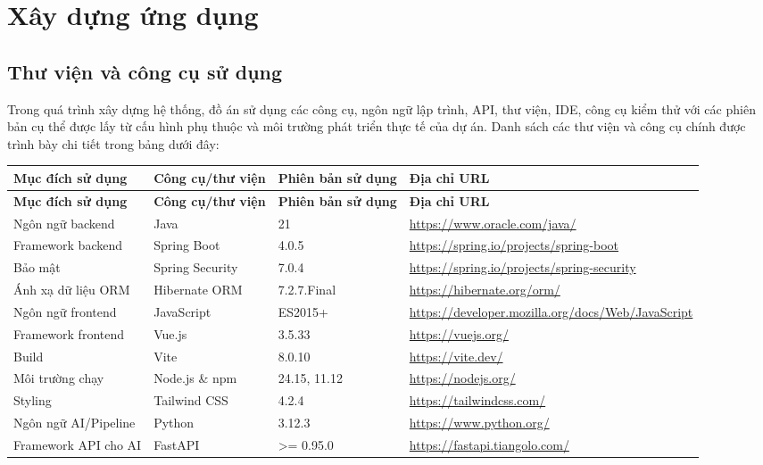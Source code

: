 \documentclass[../DoAn.tex]{subfiles}
\begin{document}
\section{Xây dựng ứng dụng}
\label{section:4.3}

\subsection{Thư viện và công cụ sử dụng}
\label{subsection:4.3.1}

Trong quá trình xây dựng hệ thống, đồ án sử dụng các công cụ, ngôn ngữ lập trình, API, thư viện, IDE, công cụ kiểm thử với các phiên bản cụ thể được lấy từ cấu hình phụ thuộc và môi trường phát triển thực tế của dự án. Danh sách các thư viện và công cụ chính được trình bày chi tiết trong bảng dưới đây:

\begin{longtable}{|p{3.5cm}|p{2.5cm}|p{2.0cm}|p{5.0cm}|}
\hline
\textbf{Mục đích sử dụng} & \textbf{Công cụ/thư viện} & \textbf{Phiên bản sử dụng} & \textbf{Địa chỉ URL} \\
\hline
\endfirsthead
\hline
\textbf{Mục đích sử dụng} & \textbf{Công cụ/thư viện} & \textbf{Phiên bản sử dụng} & \textbf{Địa chỉ URL} \\
\hline
\endhead
Ngôn ngữ backend & Java & 21 & \url{https://www.oracle.com/java/} \\
\hline
Framework backend & Spring Boot & 4.0.5 & \url{https://spring.io/projects/spring-boot} \\
\hline
Bảo mật & Spring Security & 7.0.4 & \url{https://spring.io/projects/spring-security} \\
\hline
Ánh xạ dữ liệu ORM & Hibernate ORM & 7.2.7.Final & \url{https://hibernate.org/orm/} \\
\hline
Ngôn ngữ frontend & JavaScript & ES2015+ & \url{https://developer.mozilla.org/docs/Web/JavaScript} \\
\hline
Framework frontend & Vue.js & 3.5.33 & \url{https://vuejs.org/} \\
\hline
Build & Vite & 8.0.10 & \url{https://vite.dev/} \\
\hline
Môi trường chạy & Node.js \& npm & 24.15, 11.12 & \url{https://nodejs.org/} \\
\hline
Styling & Tailwind CSS & 4.2.4 & \url{https://tailwindcss.com/} \\
\hline
Ngôn ngữ AI/Pipeline & Python & 3.12.3 & \url{https://www.python.org/} \\
\hline
Framework API cho AI & FastAPI & >= 0.95.0 & \url{https://fastapi.tiangolo.com/} \\

\end{longtable}
\end{document}

